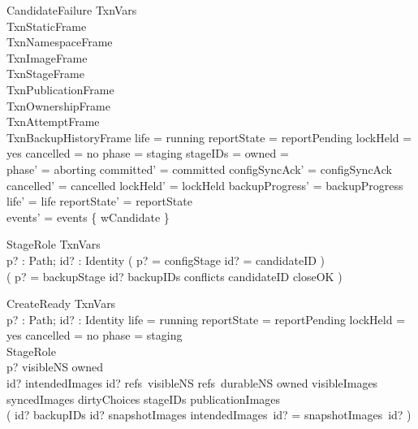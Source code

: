 \documentclass{article}
\begin{document}
\begin{schema}{CandidateFailure}
	\Delta TxnVars \\
	TxnStaticFrame \\
	TxnNamespaceFrame \\
	TxnImageFrame \\
	TxnStageFrame \\
	TxnPublicationFrame \\
	TxnOwnershipFrame \\
	TxnAttemptFrame \\
	TxnBackupHistoryFrame
	\where
	life = running \land reportState = reportPending \land lockHeld = yes \land
	cancelled = no \land phase = staging \land stageIDs = \emptyset \land owned = \emptyset \\
	phase' = aborting \land committed' = committed \land
	configSyncAck' = configSyncAck \land cancelled' = cancelled \land
	lockHeld' = lockHeld \land backupProgress' = backupProgress \land
	life' = life \land reportState' = reportState \\
	events' = events \cup \{ wCandidate \}
\end{schema}

\begin{schema}{StageRole}
	TxnVars \\
	p? : Path; id? : Identity
	\where
	( p? = configStage \land id? = candidateID ) \lor \\
	( p? = backupStage \land id? \in backupIDs \land conflicts \neq \emptyset \land
	candidateID \in closeOK )
\end{schema}

\begin{schema}{CreateReady}
	TxnVars \\
	p? : Path; id? : Identity
	\where
	life = running \land reportState = reportPending \land lockHeld = yes \land
	cancelled = no \land phase = staging \\
	StageRole \\
	p? \notin \dom visibleNS \cup \dom owned \\
	id? \in \dom intendedImages \land id? \notin refs~visibleNS \cup refs~durableNS
	\cup \ran owned \cup \dom visibleImages \cup \dom syncedImages
	\cup \dom dirtyChoices \cup stageIDs \cup \dom publicationImages \\
	( id? \in backupIDs \implies id? \in \dom snapshotImages \land
	intendedImages~id? = snapshotImages~id? )
\end{schema}
\end{document}
